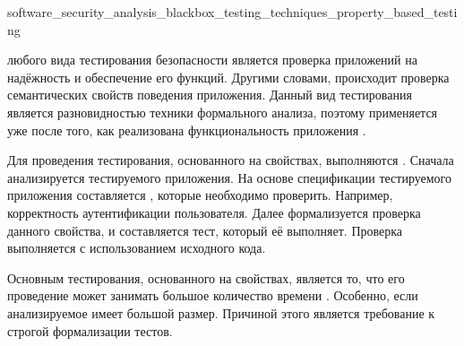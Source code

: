 	{software_security_analysis_blackbox_testing_techniques_property_based_testing}

%
 любого вида тестирования безопасности является проверка приложений на надёжность и обеспечение его функций. 
%
Другими словами, происходит проверка семантических свойств поведения приложения. 
%
Данный вид тестирования является разновидностью техники формального анализа, поэтому применяется уже после того, как реализована функциональность приложения .

%
Для проведения тестирования, основанного на свойствах, выполняются  
. 
%
Сначала анализируется  тестируемого приложения. 
%
На основе спецификации тестируемого приложения составляется , которые необходимо проверить. 
%
Например, корректность аутентификации пользователя. 
%
Далее формализуется проверка данного свойства, и составляется тест, который её выполняет. 
%
Проверка выполняется с использованием исходного кода.

%
Основным  тестирования, основанного на свойствах, является то, что его проведение может занимать большое количество времени . 
%
Особенно, если анализируемое  имеет большой размер. 
%
Причиной этого является требование к строгой формализации тестов.